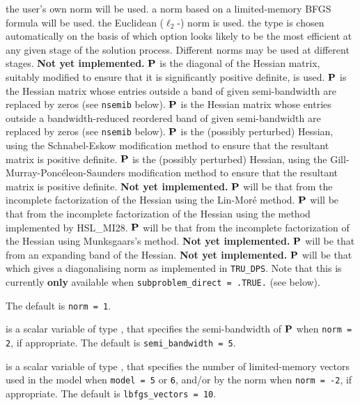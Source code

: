 \documentclass{galahad}
\newcommand{\packagename}{TRU}
\begin{document}
\begin{description}
\begin{description}
 the user's own norm will be used.
 a norm based on a limited-memory BFGS formula will be used.
 the Euclidean ($\ell_2$-) norm is used.
 the type is chosen automatically on the basis of which option looks
        likely to be the most efficient at any given stage of the solution
        process. Different norms may be used at different stages.
        {\bf Not yet implemented.}
 ${\mathbf{P}}$ is the diagonal of the Hessian matrix, suitably modified to
        ensure that it is significantly positive definite, is used.
 ${\mathbf{P}}$ is the Hessian matrix whose entries outside a band of
         given semi-bandwidth are replaced by zeros
        (see {\tt nsemib} below).
 ${\mathbf{P}}$ is the Hessian matrix whose entries outside a
        bandwidth-reduced reordered band of given semi-bandwidth are
        replaced by zeros (see {\tt nsemib} below).
 ${\mathbf{P}}$ is the (possibly perturbed) Hessian,
         using the Schnabel-Eskow modification
        method to ensure that the resultant matrix is positive definite.
 ${\mathbf{P}}$ is the (possibly perturbed) Hessian,
        using the Gill-Murray-Ponc\'{e}leon-Saunders
        modification method to ensure that the resultant matrix is
        positive definite.
        {\bf Not yet implemented.}
 ${\mathbf{P}}$ will be that from the incomplete factorization of the Hessian
        using the Lin-Mor\'{e} method.
 ${\mathbf{P}}$ will be that from the incomplete factorization of the Hessian
        using the method implemented by HSL\_MI28.
 ${\mathbf{P}}$ will be that from the incomplete factorization of the Hessian
        using Munksgaars's method. {\bf Not yet implemented.}
 ${\mathbf{P}}$ will be that from an expanding band of the Hessian.
        {\bf Not yet implemented.}
 ${\mathbf{P}}$ will be that which gives a diagonalising norm as implemented in
         {\tt \packagename\_DPS}.
          Note that this is currently {\bf only} available
         when {\tt subproblem\_direct = .TRUE.} (see below).
\end{description}
The default is {\tt norm = 1}.

 is a scalar variable of type \integer,
that specifies
the semi-bandwidth of ${\mathbf{P}}$ when {\tt norm = 2},
if appropriate.
The default is {\tt semi\_bandwidth = 5}.

 is a scalar variable of type \integer,
that specifies the number of limited-memory vectors used in the model
when {\tt model = 5} or {\tt 6},
and/or by the norm when {\tt norm = -2},
if appropriate.
The default is {\tt lbfgs\_vectors = 10}.


\end{description}
\end{document}
